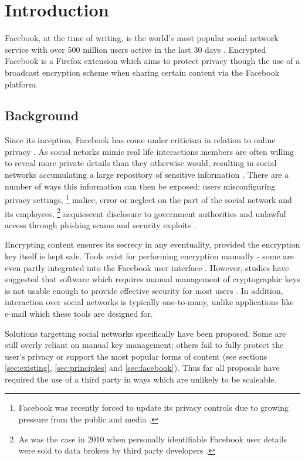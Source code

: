 \chapter{Introduction}\label{ch:introduction}

Facebook, at the time of writing, is the world's most popular social network service with over 500 million users active in the last 30 days \cite{fb-factsheet}. Encrypted Facebook is a Firefox extension which aims to protect privacy though the use of a broadcast encryption scheme when sharing certain content via the Facebook platform.


\section{Background}
\label{sec:background}

Since its inception, Facebook has come under criticism in relation to online privacy \cite{fb-cipc}. As social netorks mimic real life interactions members are often willing to reveal more private details than they otherwise would, resulting in social networks accumulating a large repository of sensitive information \cite{gross}. There are a number of ways this information can then be exposed: users misconfiguring privacy settings, \footnote{Facebook was recently forced to update its privacy controls due to growing pressure from the public and media \cite{fb-priv}.} malice, error or neglect on the part of the social network and its employees, \footnote{As was the case in 2010 when personally identifiable Facebook user details were sold to data brokers by third party developers \cite{fb-ids}.} acquiescent disclosure to government authorities and unlawful access through phishing scams and security exploits \cite{snoop} \cite{fb-phish} \cite{rockyou}.

Encrypting content ensures its secrecy in any eventuality, provided the encryption key itself is kept safe. Tools exist for performing encryption manually - some are even partly integrated into the Facebook user interface \cite{firegpg}. However, studies have suggested that software which requires manual management of cryptographic keys is not usable enough to provide effective security for most users \cite{johnny}. In addition, interaction over social networks is typically one-to-many, unlike applications like e-mail which these tools are designed for.

Solutions targetting social networks specifically have been proposed. Some are still overly reliant on manual key management; others fail to fully protect the user's privacy or support the most popular forms of content (see sections \ref{sec:existing}, \ref{sec:principles} and \ref{sec:facebook}). Thus far all proposals have required the use of a third party in ways which are unlikely to be scaleable.
  
